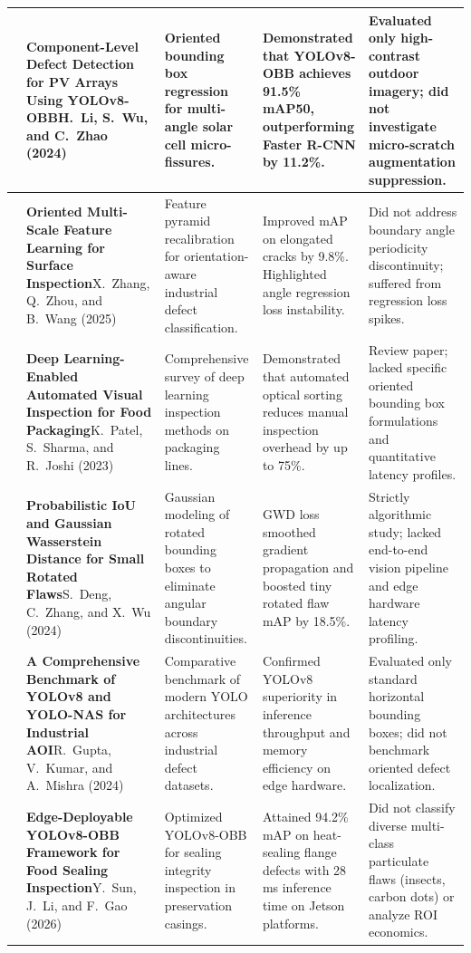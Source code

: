 \begin{longtable}{|>{\raggedright\arraybackslash}p{0.6cm}|>{\raggedright\arraybackslash}p{3.5cm}|>{\raggedright\arraybackslash}p{2.7cm}|>{\raggedright\arraybackslash}p{4.0cm}|>{\raggedright\arraybackslash}p{3.2cm}|}
5 & \textbf{Component-Level Defect Detection for PV Arrays Using YOLOv8-OBB}\newline H.~Li, S.~Wu, and C.~Zhao (2024)~\cite{li2024pv} & Oriented bounding box regression for multi-angle solar cell micro-fissures. & Demonstrated that YOLOv8-OBB achieves 91.5\% mAP50, outperforming Faster R-CNN by 11.2\%. & Evaluated only high-contrast outdoor imagery; did not investigate micro-scratch augmentation suppression.\\ \hline
6 & \textbf{Oriented Multi-Scale Feature Learning for Surface Inspection}\newline X.~Zhang, Q.~Zhou, and B.~Wang (2025)~\cite{zhang2025msf} & Feature pyramid recalibration for orientation-aware industrial defect classification. & Improved mAP on elongated cracks by 9.8\%. Highlighted angle regression loss instability. & Did not address boundary angle periodicity discontinuity; suffered from regression loss spikes.\\ \hline
7 & \textbf{Deep Learning-Enabled Automated Visual Inspection for Food Packaging}\newline K.~Patel, S.~Sharma, and R.~Joshi (2023)~\cite{patel2023deep} & Comprehensive survey of deep learning inspection methods on packaging lines. & Demonstrated that automated optical sorting reduces manual inspection overhead by up to 75\%. & Review paper; lacked specific oriented bounding box formulations and quantitative latency profiles.\\ \hline
8 & \textbf{Probabilistic IoU and Gaussian Wasserstein Distance for Small Rotated Flaws}\newline S.~Deng, C.~Zhang, and X.~Wu (2024)~\cite{deng2024probiou} & Gaussian modeling of rotated bounding boxes to eliminate angular boundary discontinuities. & GWD loss smoothed gradient propagation and boosted tiny rotated flaw mAP by 18.5\%. & Strictly algorithmic study; lacked end-to-end vision pipeline and edge hardware latency profiling.\\ \hline
9 & \textbf{A Comprehensive Benchmark of YOLOv8 and YOLO-NAS for Industrial AOI}\newline R.~Gupta, V.~Kumar, and A.~Mishra (2024)~\cite{gupta2024benchmark} & Comparative benchmark of modern YOLO architectures across industrial defect datasets. & Confirmed YOLOv8 superiority in inference throughput and memory efficiency on edge hardware. & Evaluated only standard horizontal bounding boxes; did not benchmark oriented defect localization.\\ \hline
10 & \textbf{Edge-Deployable YOLOv8-OBB Framework for Food Sealing Inspection}\newline Y.~Sun, J.~Li, and F.~Gao (2026)~\cite{sun2026edgedeployable} & Optimized YOLOv8-OBB for sealing integrity inspection in preservation casings. & Attained 94.2\% mAP on heat-sealing flange defects with 28 ms inference time on Jetson platforms. & Did not classify diverse multi-class particulate flaws (insects, carbon dots) or analyze ROI economics.\\ \hline

\end{longtable}
